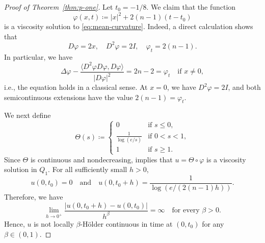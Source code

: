 \documentclass[a4paper,11pt]{amsart}
\theoremstyle{plain}
\theoremstyle{definition}
\numberwithin{equation}{section}
\begin{document}
\begin{proof}[Proof of Theorem~\ref{thm:p-one}]
Let $t_0=-1/8$. We claim that the function
\begin{equation*}
 \varphi(x,t)\coloneqq|x|^2+2(n-1)(t-t_0)
\end{equation*}
is a viscosity solution to \eqref{eq:mean-curvature}. Indeed, a direct calculation shows that
\begin{equation*}
    D\varphi=2x, \quad D^2\varphi=2I, \quad \varphi_t=2(n-1).
\end{equation*}
In particular, we have
\begin{equation*}
    \Delta \varphi-\frac{\langle D^2\varphi D\varphi, D\varphi \rangle}{|D\varphi|^2}=2n-2=\varphi_t \quad \text{if $x \neq 0$},
\end{equation*}
i.e., the equation holds in a classical sense. At $x=0$, we have $D^2\varphi=2I$, and both semicontinuous extensions have the value $2(n-1)=\varphi_t$.

We next define
\begin{equation*}
 \Theta(s)\coloneqq
 \begin{cases}
  0& \text{if $s\leq0$},\\
  \displaystyle\frac1{\log(e/s)}& \text{if $0<s<1$},\\
  1& \text{if $s\geq1$}.
 \end{cases}
\end{equation*}
Since $\Theta$ is continuous and nondecreasing, \cite[Theorem~5.6]{CGG91} implies that
$u=\Theta\circ\varphi$ is a viscosity solution in $Q_1$. For all sufficiently small $h>0$,
\begin{equation*}
 u(0,t_0)=0 \quad\text{and} \quad u(0,t_0+h)=\frac1{\log\left(e/(2(n-1)h)\right)}.
\end{equation*}
Therefore, we have
\begin{equation*}
 \lim_{h\to 0^+}\frac{|u(0,t_0+h)-u(0,t_0)|}{h^\beta}=\infty\quad\text{for every }\beta>0.
\end{equation*}
Hence, $u$ is not locally $\beta$-H\"older continuous in time at $(0,t_0)$ for any $\beta\in(0,1)$.
\end{proof}
\end{document}
